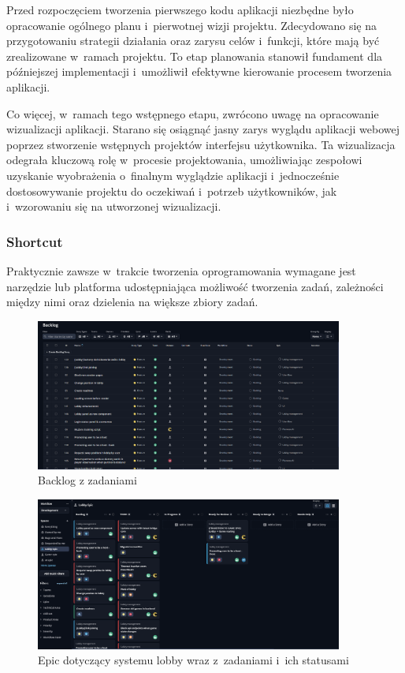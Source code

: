Przed rozpoczęciem tworzenia pierwszego kodu aplikacji niezbędne było
opracowanie ogólnego planu i~pierwotnej wizji projektu. Zdecydowano
się na przygotowaniu strategii działania oraz
zarysu celów i~funkcji, które mają być zrealizowane w~ramach projektu.
To etap planowania stanowił fundament dla późniejszej implementacji
i~umożliwił efektywne kierowanie procesem tworzenia aplikacji.

Co więcej, w~ramach tego wstępnego etapu, zwrócono uwagę na
opracowanie wizualizacji aplikacji. Starano się osiągnąć jasny
zarys wyglądu aplikacji webowej poprzez stworzenie wstępnych projektów
interfejsu użytkownika. Ta wizualizacja odegrała kluczową rolę
w~procesie projektowania, umożliwiając zespołowi uzyskanie wyobrażenia
o~finalnym wyglądzie aplikacji i~jednocześnie dostosowywanie projektu
do oczekiwań i~potrzeb użytkowników, jak i~wzorowaniu się na utworzonej
wizualizacji.


\subsubsection{Shortcut}

Praktycznie zawsze w~trakcie tworzenia oprogramowania wymagane jest
narzędzie lub platforma udostępniająca możliwość tworzenia zadań,
zależności między nimi oraz dzielenia na większe zbiory zadań.

\begin{figure}[h!]
    \centering
    \includegraphics[width=0.9\textwidth]{img/shortcut/shortcut_backlog.png}
    \caption{Backlog z zadaniami}
\end{figure}

\begin{figure}[h!]
    \centering
    \includegraphics[width=0.9\textwidth]{img/shortcut/shortcut_epic.png}
    \caption{Epic dotyczący systemu lobby wraz z~zadaniami i~ich statusami}
\end{figure}

